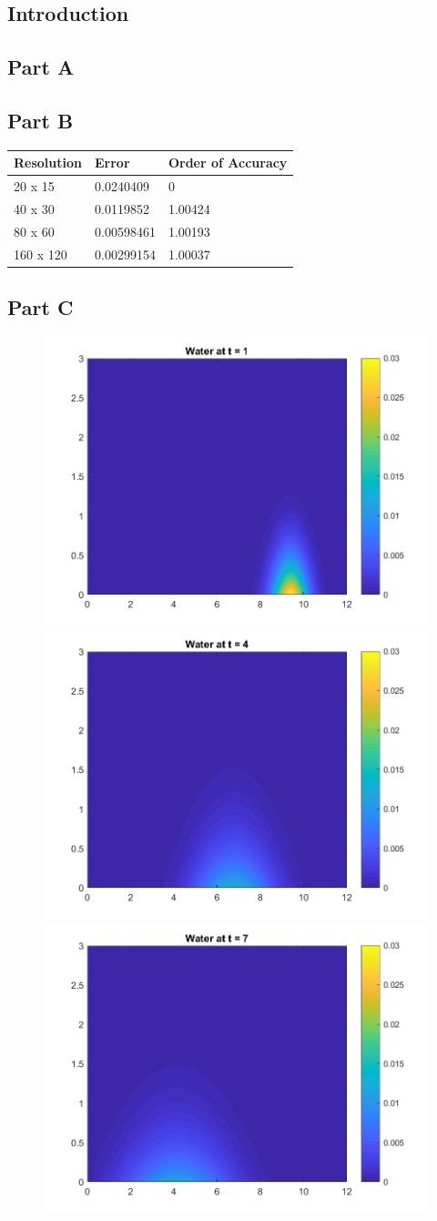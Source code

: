 \documentclass[12pt]{article}
\begin{document}
\subsection*{Introduction}
\subsection*{Part A}
\subsection*{Part B}
\begin{table}[]
\centering
\label{p2_table}
\begin{tabular}{|l|l|l|}
\hline
Resolution & Error      & Order of Accuracy \\ \hline
20 x 15    & 0.0240409  & 0                 \\ \hline
40 x 30    & 0.0119852  & 1.00424           \\ \hline
80 x 60    & 0.00598461 & 1.00193           \\ \hline
160 x 120  & 0.00299154 & 1.00037           \\ \hline
\end{tabular}
\end{table}
\subsection*{Part C}
\begin{figure}[htp]
\begin{adjustwidth}{-2cm}{-2cm}
\centering
\includegraphics[width=.41\textwidth]{Problem2_fig1.png}\hfill
\includegraphics[width=.41\textwidth]{Problem2_fig2.png}\hfill
\includegraphics[width=.41\textwidth]{Problem2_fig3.png}
\label{fig:p2_fig1-3}
\end{adjustwidth}
\end{figure}
\end{document}
